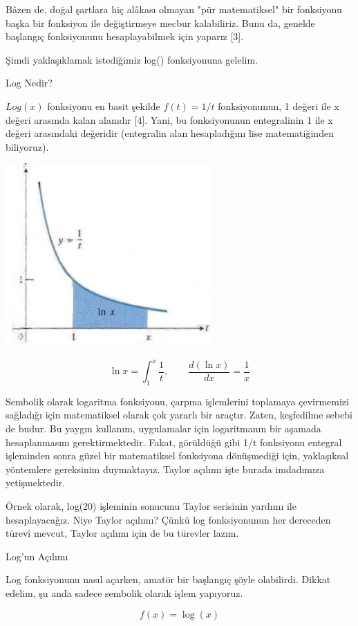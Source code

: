 \documentclass[12pt,fleqn]{article}\usepackage{../../common}
\begin{document}
Bâzen de, doğal şartlara hiç alâkası olmayan "pür matematiksel" bir
fonksiyonu başka bir fonksiyon ile değiştirmeye mecbur kalabiliriz. Bunu
da, genelde başlangıç fonksiyonunu hesaplayabilmek için yaparız [3].

Şimdi yaklaşıklamak istediğimiz log() fonksiyonuna gelelim.

Log Nedir?

$Log(x)$ fonksiyonu en basit şekilde $f(t)=1/t$ fonksiyonunun, 1 değeri ile x
değeri arasında kalan alanıdır [4]. Yani, bu fonksiyonunun entegralinin 1 ile
x değeri arasındaki değeridir (entegralin alan hesapladığını lise
matematiğinden biliyoruz).

\includegraphics[height=7cm]{taylor_log_graph.jpg}

$$ \ln x = \int_{1}^{x} \frac{1}{t}, \qquad \frac{d(\ln x)}{dx} = \frac{1}{x}$$

Sembolik olarak logaritma fonksiyonu, çarpma işlemlerini toplamaya
çevirmemizi sağladığı için matematiksel olarak çok yararlı bir
araçtır. Zaten, keşfedilme sebebi de budur. Bu yaygın kullanım, uygulamalar
için logaritmanın bir aşamada hesaplanmasını gerektirmektedir. Fakat,
görüldüğü gibi 1/t fonksiyonu entegral işleminden sonra güzel bir
matematiksel fonksiyona dönüşmediği için, yaklaşıksal yöntemlere gereksinim
duymaktayız. Taylor açılımı işte burada imdadımıza yetişmektedir.

Örnek olarak, log(20) işleminin sonucunu Taylor serisinin yardımı ile
hesaplayacağız. Niye Taylor açılımı? Çünkü log fonksiyonunun her dereceden
türevi mevcut, Taylor açılımı için de bu türevler lazım.

Log'un Açılımı

Log fonksiyonunu nasıl açarken, amatör bir başlangıç şöyle
olabilirdi. Dikkat edelim, şu anda sadece sembolik olarak işlem yapıyoruz.

$$ f(x) = \log(x) $$
\end{document}
